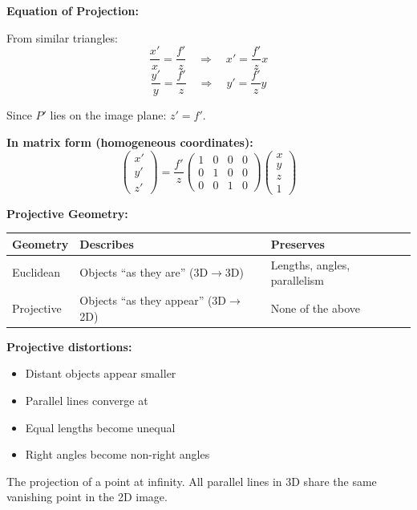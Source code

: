 \textbf{Equation of Projection:}

From similar triangles:
\[
\frac{x'}{x} = \frac{f'}{z} \quad\Rightarrow\quad x' = \frac{f'}{z} x
\]
\[
\frac{y'}{y} = \frac{f'}{z} \quad\Rightarrow\quad y' = \frac{f'}{z} y
\]

Since $P'$ lies on the image plane: $z' = f'$.

\textbf{In matrix form (homogeneous coordinates):}
\[
\begin{pmatrix} x' \\ y' \\ z' \end{pmatrix} = \frac{f'}{z} \begin{pmatrix} 1 & 0 & 0 & 0 \\ 0 & 1 & 0 & 0 \\ 0 & 0 & 1 & 0 \end{pmatrix} \begin{pmatrix} x \\ y \\ z \\ 1 \end{pmatrix}
\]

\separator

\textbf{Projective Geometry:}

\begin{center}
\renewcommand{\arraystretch}{1.3}
\begin{tabular}{@{} l p{5cm} p{5cm} @{}}
\toprule
\textbf{Geometry} & \textbf{Describes} & \textbf{Preserves} \\
\midrule
Euclidean & Objects ``as they are'' (3D$\rightarrow$3D) & Lengths, angles, parallelism \\
Projective & Objects ``as they appear'' (3D$\rightarrow$2D) & None of the above \\
\bottomrule
\end{tabular}
\end{center}

\textbf{Projective distortions:}
\begin{itemize}
  \item Distant objects appear smaller
  \item Parallel lines converge at 
  \item Equal lengths become unequal
  \item Right angles become non-right angles
\end{itemize}

\begin{defbox}
The projection of a point at infinity. All parallel lines in 3D share the same vanishing point in the 2D image.
\end{defbox}

